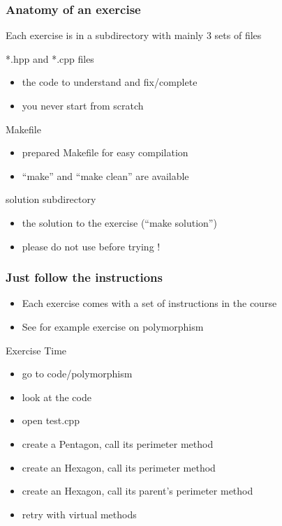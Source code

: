 \documentclass[compress]{beamer}
\begin{document}
\begin{frame}
  \frametitle{Anatomy of an exercise}
  Each exercise is in a subdirectory with mainly 3 sets of files
  \begin{exampleblock}{*.hpp and *.cpp files}
    \begin{itemize}
    \item the code to understand and fix/complete
    \item you never start from scratch
    \end{itemize}
  \end{exampleblock}
  \begin{block}{Makefile}
    \begin{itemize}
    \item prepared Makefile for easy compilation
    \item ``make'' and ``make clean'' are available
    \end{itemize}
  \end{block}
  \begin{alertblock}{solution subdirectory}
    \begin{itemize}
    \item the solution to the exercise (``make solution'')
    \item please do not use before trying !
    \end{itemize}
  \end{alertblock}
\end{frame}

\begin{frame}
  \frametitle{Just follow the instructions}
  \begin{itemize}
  \item Each exercise comes with a set of instructions in the course
  \item See for example exercise on polymorphism
  \end{itemize}
  \begin{alertblock}{Exercise Time}
    \begin{itemize}
    \item go to code/polymorphism
    \item look at the code
    \item open test.cpp
    \item create a Pentagon, call its perimeter method
    \item create an Hexagon, call its perimeter method
    \item create an Hexagon, call its parent's perimeter method
    \item retry with virtual methods
    \end{itemize}
  \end{alertblock}
\end{frame}
\end{document}
